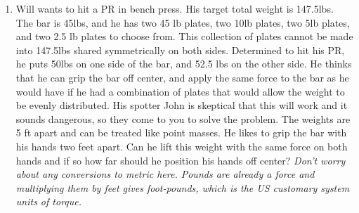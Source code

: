 \begin{enumerate}
	\item
	Will wants to hit a PR in bench press. His target total weight is 147.5lbs. The bar is 45lbs, and he has two 45 lb plates, two 10lb plates, two 5lb plates, and two 2.5 lb plates to choose from. This collection of plates cannot be made into 147.5lbs shared symmetrically on both sides. Determined to hit his PR, he puts 50lbs on one side of the bar, and 52.5 lbs on the other side. He thinks that he can grip the bar off center, and apply the same force to the bar as he would have if he had a combination of plates that would allow the weight to be evenly distributed. His spotter John is skeptical that this will work and it sounds dangerous, so they come to you to solve the problem. The weights are 5 ft apart and can be treated like point masses. He likes to grip the bar with his hands two feet apart. Can he lift this weight with the same force on both hands and if so how far should he position his hands off center? \emph{Don't worry about any conversions to metric here. Pounds are already a force and multiplying them by feet gives foot-pounds, which is the US customary system units of torque.}

	
\end{enumerate}